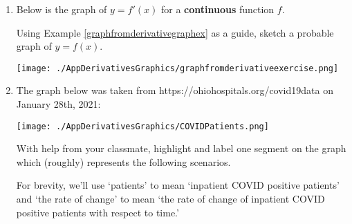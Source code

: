 \documentclass{ximera}
\begin{document}
\begin{enumerate}
\begin{enumerate}
\begin{multicols}{2}
 $f(x) > 0$:
 
  $f(x) < 0$:

\end{multicols}

\smallskip

\begin{multicols}{2}

 $f'(x) > 0$:
 
  $f'(x) < 0$:

\end{multicols}

\smallskip

\begin{multicols}{2}

 $f''(x) > 0$:
 
  $f''(x) < 0$:

\end{multicols}

\end{enumerate}


\item  Below is the graph of $y = f'(x)$ for a \textbf{continuous} function $f$.  

\smallskip

Using Example \ref{graphfromderivativegraphex} as a guide,  sketch a probable graph of $y = f(x)$.  

\begin{center}

\centerline{\texttt{[image: ./AppDerivativesGraphics/graphfromderivativeexercise.png]}}
\end{center}


\newpage

\item  The graph below was taken from https://ohiohospitals.org/covid19data on January 28th, 2021:

\bigskip

\centerline{\texttt{[image: ./AppDerivativesGraphics/COVIDPatients.png]}}

\bigskip


With help from your classmate, highlight and label one segment on the graph which (roughly) represents the following scenarios.

\smallskip

For brevity, we'll use `patients' to mean `inpatient COVID positive patients' and `the rate of change' to mean `the rate of change of inpatient COVID positive patients with respect to time.'

\smallskip


\end{enumerate}
\end{document}
